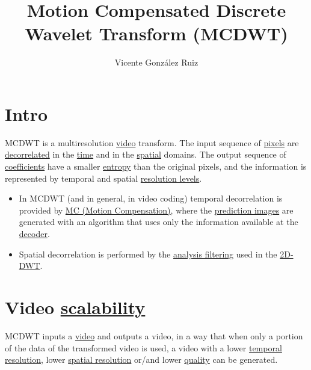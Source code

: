
\title{Motion Compensated Discrete Wavelet Transform
(MCDWT)}

\author{Vicente González Ruiz}

\maketitle
\section{Intro}

MCDWT is a multiresolution
\href{https://en.wikipedia.org/wiki/Video}{video} transform. The input
sequence of \href{https://en.wikipedia.org/wiki/Pixel}{pixels} are
\href{https://en.wikipedia.org/wiki/Decorrelation}{decorrelated} in
the \href{https://en.wikipedia.org/wiki/Time_domain}{time} and in the
\href{https://www.quora.com/What-is-spatial-domain-in-image-processing}{spatial}
domains. The output sequence of
\href{https://www.quora.com/What-is-spatial-domain-in-image-processing}{coefficients}
have a smaller \href{https://en.wikipedia.org/wiki/Entropy}{entropy}
than the original pixels, and the information is represented by
temporal and spatial
\href{https://en.wikipedia.org/wiki/Image_resolution}{resolution
  levels}.

\begin{itemize}
\item
  In MCDWT (and in general, in video coding) temporal decorrelation is
  provided by
  \href{https://en.wikipedia.org/wiki/Motion_compensation}{MC (Motion
  Compensation)}, where the
  \href{https://en.wikipedia.org/wiki/Decoder}{prediction images} are
  generated with an algorithm that uses only the information available
  at the \href{https://en.wikipedia.org/wiki/Decoder}{decoder}.
\item
  Spatial decorrelation is performed by the
  \href{https://en.wikipedia.org/wiki/Digital_filter\#Analysis_techniques}{analysis
  filtering} used in the
  \href{https://en.wikipedia.org/wiki/Discrete_wavelet_transform}{2D-DWT}.
\end{itemize}

\section{Video \href{http://inst.eecs.berkeley.edu/~ee290t/sp04/lectures/videowavelet_UCB1-3.pdf}{scalability}}
MCDWT inputs a \href{https://en.wikipedia.org/wiki/Video}{video} and
outputs a video, in a way that when only a portion of the data of the
transformed video is used, a video with a lower
\href{https://en.wikipedia.org/wiki/Temporal_resolution}{temporal
resolution}, lower
\href{https://en.wikipedia.org/wiki/Image_resolution\#Spatial_resolution}{spatial
resolution} or/and lower
\href{https://en.wikipedia.org/wiki/Compression_artifact}{quality} can
be generated.

